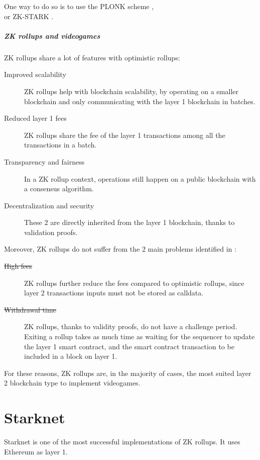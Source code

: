 \documentclass[12pt]{article}
\begin{document}
One way to do so is to use the PLONK scheme \cite{plonk},\\or ZK-STARK \cite{zk-stark}.

\subsubsection{ZK rollups and videogames} \label{subsubsection:zkrav}
ZK rollups share a lot of features with optimistic rollups:
\begin{description}
    \item[Improved scalability] ZK rollups help with blockchain scalability, by operating on a smaller blockchain and only communicating with the layer 1 blockchain in batches.
    \item[Reduced layer 1 fees] ZK rollups share the fee of the layer 1 transactions among all the transactions in a batch.
    \item[Transparency and fairness] In a ZK rollup context, operations still happen on a public blockchain with a consensus algorithm.
    \item[Decentralization and security] These 2 are directly inherited from the layer 1 blockchain, thanks to validation proofs. 
\end{description}

Moreover, ZK rollups do not suffer from the 2 main problems identified in :
\begin{description}
    \item[\st{High fees}] ZK rollups further reduce the fees compared to optimistic rollups, since layer 2 transactions inputs must not be stored as calldata.
    \item[\st{Withdrawal time}] ZK rollups, thanks to validity proofs, do not have a challenge period. Exiting a rollup takes as much time as waiting for the sequencer to update the layer 1 smart contract, and the smart contract transaction to be included in a block on layer 1.  
\end{description}

For these reasons, ZK rollups are, in the majority of cases, the most suited layer 2 blockchain type to implement videogames.

\newpage
\part{Starknet} \label{part:starknet}
Starknet is one of the most successful implementations of ZK rollups. It uses Ethereum as layer 1.
\end{document}
